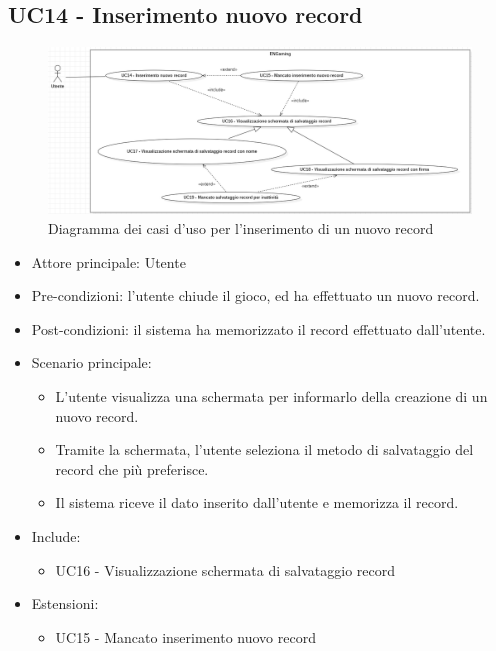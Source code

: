 \subsection{UC14 - Inserimento nuovo record}
\begin{figure}[h]
    \centering
    \includegraphics[width=410pt]{images/usecase/UC14.png}
    \caption{Diagramma dei casi d'uso per l'inserimento di un nuovo record}
    \label{fig:UC14}
\end{figure}
\begin{itemize}
    \item Attore principale: Utente
    \item Pre-condizioni: l'utente chiude il gioco, ed ha effettuato un nuovo record.
    \item Post-condizioni: il sistema ha memorizzato il record effettuato dall'utente.
    \item Scenario principale: \begin{itemize}
        \item L'utente visualizza una schermata per informarlo della creazione di un nuovo record.
        \item Tramite la schermata, l'utente seleziona il metodo di salvataggio del record che più preferisce.
        \item Il sistema riceve il dato inserito dall'utente e memorizza il record.
    \end{itemize}
    \item Include: \begin{itemize}
        \item UC16 - Visualizzazione schermata di salvataggio record
    \end{itemize}
    \item Estensioni: \begin{itemize}
        \item UC15 - Mancato inserimento nuovo record 
    \end{itemize}
\end{itemize}

